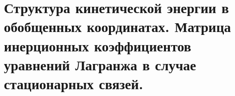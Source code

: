 \chapter{Структура кинетической энергии в обобщенных координатах. Матрица
инерционных коэффициентов уравнений Лагранжа в случае стационарных связей.}

\newpage
